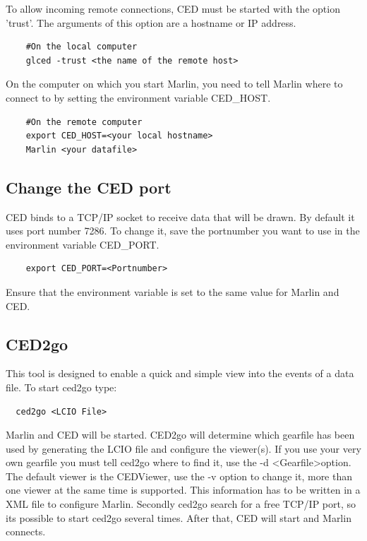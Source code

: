 \documentclass[a4paper,10pt]{article}
\begin{document}
To allow incoming remote connections, CED must be started with the option 'trust'. The arguments of this option are a hostname or IP address.
\begin{verbatim}
    #On the local computer
    glced -trust <the name of the remote host>
\end{verbatim}
On the computer on which you start Marlin, you need to tell Marlin where to connect to by setting the environment variable CED\_HOST.
\begin{verbatim}
    #On the remote computer
    export CED_HOST=<your local hostname>
    Marlin <your datafile>
\end{verbatim}

\subsection{Change the CED port}
CED binds to a TCP/IP socket to receive data that will be drawn. By default it uses port number 7286. To change it, save the portnumber you want to use in the environment variable CED\_PORT. 
\begin{verbatim}
    export CED_PORT=<Portnumber>
\end{verbatim}
Ensure that the environment variable is set to the same value for Marlin and CED.

\subsection{CED2go}
This tool is designed to enable a quick and simple view into the events of a data file. To start ced2go type:
 \begin{verbatim}
  ced2go <LCIO File>
 \end{verbatim}
Marlin and CED will be started.
\newline\newline
CED2go will determine which gearfile has been used by generating the LCIO file and configure the viewer(s). If you use your very own gearfile you must tell ced2go where to find it, use the -d \textless Gearfile\textgreater   option. The default viewer is the CEDViewer, use the -v option to change it, more than one viewer at the same time is supported. This information has to be written in a XML file to configure Marlin. Secondly ced2go  search for a free TCP/IP port, so its possible to start ced2go several times. After that, CED will start and Marlin connects.
 
\end{document}
